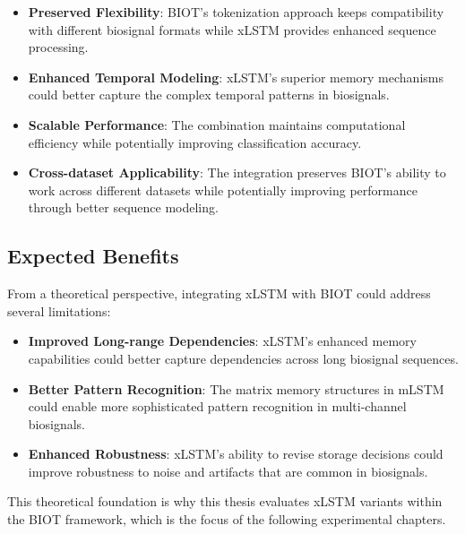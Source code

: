 \begin{itemize}
    \item \textbf{Preserved Flexibility}: \ac{BIOT}'s tokenization approach keeps compatibility with different biosignal formats while \ac{xLSTM} provides enhanced sequence processing.
    
    \item \textbf{Enhanced Temporal Modeling}: \ac{xLSTM}'s superior memory mechanisms could better capture the complex temporal patterns in biosignals.
    
    \item \textbf{Scalable Performance}: The combination maintains computational efficiency while potentially improving classification accuracy.
    
    \item \textbf{Cross-dataset Applicability}: The integration preserves \ac{BIOT}'s ability to work across different datasets while potentially improving performance through better sequence modeling.
\end{itemize}

\subsection{Expected Benefits}

From a theoretical perspective, integrating \ac{xLSTM} with \ac{BIOT} could address several limitations:

\begin{itemize}
    \item \textbf{Improved Long-range Dependencies}: \ac{xLSTM}'s enhanced memory capabilities could better capture dependencies across long biosignal sequences.
    
    \item \textbf{Better Pattern Recognition}: The matrix memory structures in \ac{mLSTM} could enable more sophisticated pattern recognition in multi-channel biosignals.
    
    \item \textbf{Enhanced Robustness}: \ac{xLSTM}'s ability to revise storage decisions could improve robustness to noise and artifacts that are common in biosignals.
\end{itemize}

This theoretical foundation is why this thesis evaluates \ac{xLSTM} variants within the \ac{BIOT} framework, which is the focus of the following experimental chapters.



